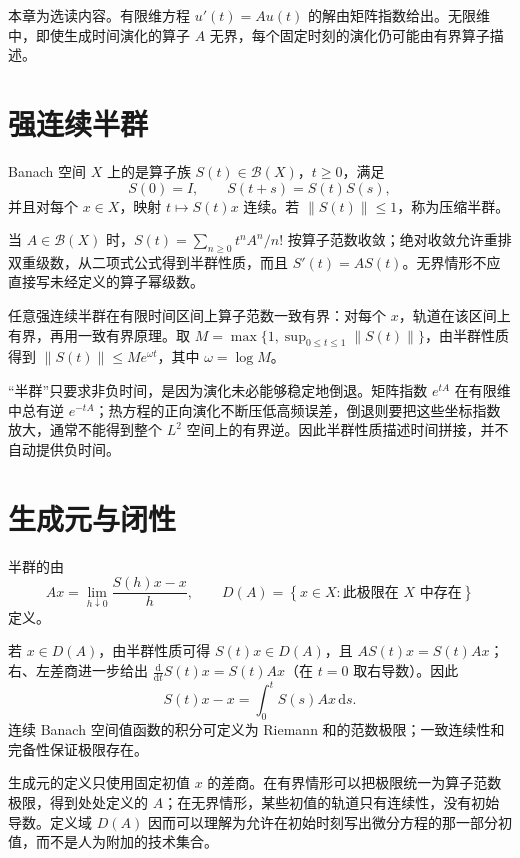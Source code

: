 \documentclass[UTF8,12pt,a4paper,fontset=fandol]{ctexbook}
\begin{document}
本章为选读内容。有限维方程 $u'(t)=Au(t)$ 的解由矩阵指数给出。无限维中，即使生成时间演化的算子 $A$ 无界，每个固定时刻的演化仍可能由有界算子描述。

\section{强连续半群}
\begin{definition}
Banach 空间 $X$ 上的是算子族 $S(t)\in\mathcal B(X)$，$t\geq0$，满足
\[
 S(0)=I,\qquad S(t+s)=S(t)S(s),
\]
并且对每个 $x\in X$，映射 $t\mapsto S(t)x$ 连续。若 $\|S(t)\|\leq1$，称为压缩半群。
\end{definition}
当 $A\in\mathcal B(X)$ 时，$S(t)=\sum_{n\geq0}t^nA^n/n!$ 按算子范数收敛；绝对收敛允许重排双重级数，从二项式公式得到半群性质，而且 $S'(t)=AS(t)$。无界情形不应直接写未经定义的算子幂级数。

任意强连续半群在有限时间区间上算子范数一致有界：对每个 $x$，轨道在该区间上有界，再用一致有界原理。取 $M=\max\{1,\sup_{0\leq t\leq1}\|S(t)\|\}$，由半群性质得到 $\|S(t)\|\leq M e^{\omega t}$，其中 $\omega=\log M$。

“半群”只要求非负时间，是因为演化未必能够稳定地倒退。矩阵指数 $e^{tA}$ 在有限维中总有逆 $e^{-tA}$；热方程的正向演化不断压低高频误差，倒退则要把这些坐标指数放大，通常不能得到整个 $L^2$ 空间上的有界逆。因此半群性质描述时间拼接，并不自动提供负时间。

\section{生成元与闭性}
\begin{definition}
半群的由
\begin{equation}
 Ax=\lim_{h\downarrow0}\frac{S(h)x-x}{h},\qquad
 D(A)=\left\{x\in X:\text{此极限在 }X\text{ 中存在}\right\}
 \label{eq:fa-semigroup-generator}
\end{equation}
定义。
\end{definition}
若 $x\in D(A)$，由半群性质可得 $S(t)x\in D(A)$，且 $AS(t)x=S(t)Ax$；右、左差商进一步给出 $\frac{\mathrm d}{\mathrm dt}S(t)x=S(t)Ax$（在 $t=0$ 取右导数）。因此
\begin{equation}
 S(t)x-x=\int_0^tS(s)Ax\,\mathrm ds.
 \label{eq:fa-generator-integral}
\end{equation}
连续 Banach 空间值函数的积分可定义为 Riemann 和的范数极限；一致连续性和完备性保证极限存在。

生成元的定义只使用固定初值 $x$ 的差商。在有界情形可以把极限统一为算子范数极限，得到处处定义的 $A$；在无界情形，某些初值的轨道只有连续性，没有初始导数。定义域 $D(A)$ 因而可以理解为允许在初始时刻写出微分方程的那一部分初值，而不是人为附加的技术集合。
\end{document}
